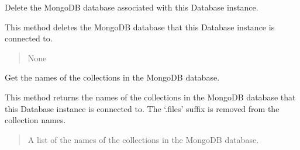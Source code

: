 \documentclass[letterpaper,10pt,english]{sphinxmanual}
\begin{document}
\begin{fulllineitems}
\begin{fulllineitems}
\begin{quote}
\begin{description}
\end{description}\end{quote}

\end{fulllineitems}


\begin{fulllineitems}
\label{\detokenize{forensicfit.database.database:forensicfit.database.database.Database.delete_database}}
\pysigstartsignatures
{}
\pysigstopsignatures
\sphinxAtStartPar
Delete the MongoDB database associated with this Database instance.

\sphinxAtStartPar
This method deletes the MongoDB database that this Database instance is connected to.
\begin{quote}\begin{description}
\sphinxAtStartPar
None

\end{description}\end{quote}

\end{fulllineitems}


\begin{fulllineitems}
\label{\detokenize{forensicfit.database.database:forensicfit.database.database.Database.collection_names}}
\pysigstartsignatures
{}
\pysigstopsignatures
\sphinxAtStartPar
Get the names of the collections in the MongoDB database.

\sphinxAtStartPar
This method returns the names of the collections in the MongoDB database that this Database
instance is connected to. The ‘.files’ suffix is removed from the collection names.
\begin{quote}\begin{description}
\sphinxAtStartPar
A list of the names of the collections in the MongoDB database.


\end{description}
\end{quote}
\end{fulllineitems}
\end{fulllineitems}
\end{document}
